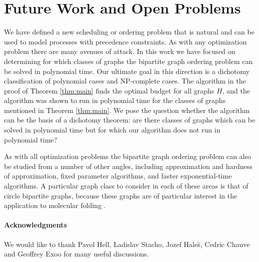 \documentclass[letterpaper,11pt,abstracton]{scrartcl}
\begin{document}
\section{Future Work and Open Problems} \label{sec:future}

We have defined a new scheduling or ordering problem that is
natural and can be used to model processes with precedence
constraints.  As with any optimization problem there are many avenues
of attack.  In this work we have focused on determining for which
classes of graphs the bipartite graph ordering problem can be solved in
polynomial time.  Our ultimate goal in this direction is a dichotomy
classification of polynomial cases and NP-complete cases.  The algorithm
in the proof of Theorem \ref{thm:main} finds the optimal budget for
all graphs $H$, and the algorithm was shown to run in polynomial time
for the classes of graphs mentioned in Theorem \ref{thm:main}.  We pose the
question whether the algorithm can be the basis of a dichotomy theorem:
are there classes of graphs which can be solved in polynomial time but
for which our algorithm does not run in polynomial time?


As with all optimization problems the bipartite graph ordering problem can
also be studied from a number of other angles, including approximation
and hardness of approximation, fixed parameter algorithms, and faster
exponential-time algorithms.
A particular graph class to consider in
each of these areas is that of circle bipartite graphs, because these graphs are
of particular interest in the application to molecular folding \cite{GFWT08,MH98,TMRM09}.




\paragraph{\textbf Acknowledgments}
We would like to thank
Pavol Hell, Ladislav Stacho, Jozef Hale\u{s}, Cedric Chauve and Geoffrey Exoo for many useful
discussions.

\vspace{-3mm}
\end{document}
